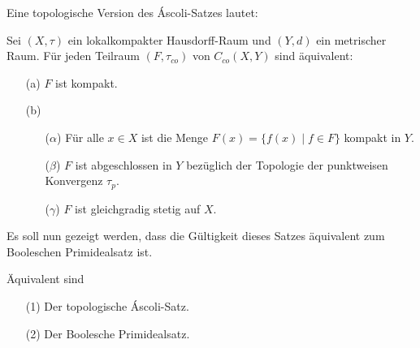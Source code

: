 Eine topologische Version des Áscoli-Satzes lautet:
\begin{defn}
  Sei $(X,\tau)$ ein lokalkompakter Hausdorff-Raum und $(Y,d)$ ein metrischer Raum.
  Für jeden Teilraum $(F,\tau_{co})$ von $C_{co}(X,Y)$ sind äquivalent:
  \begin{enumerate}
    \item[(a)] $F$ ist kompakt.
    \item[(b)] \begin{enumerate}
        \item[($\alpha$)] Für alle $x \in X$ ist die Menge $F(x) = \{f(x) \mid f \in F \}$ kompakt in $Y$.
        \item[($\beta$)]  $F$ ist abgeschlossen in $Y$ bezüglich der Topologie der punktweisen Konvergenz $\tau_p$.
        \item[($\gamma$)] $F$ ist gleichgradig stetig auf $X$.
      \end{enumerate}
  \end{enumerate}
\end{defn}

Es soll nun gezeigt werden, dass die Gültigkeit dieses Satzes äquivalent zum Booleschen Primidealsatz ist.

\begin{thm}
  \label{thm:ascoliPIT}
  Äquivalent sind
  \begin{enumerate}
    \item[(1)] Der topologische Áscoli-Satz.
    \item[(2)] Der Boolesche Primidealsatz.
  \end{enumerate}
\end{thm}


